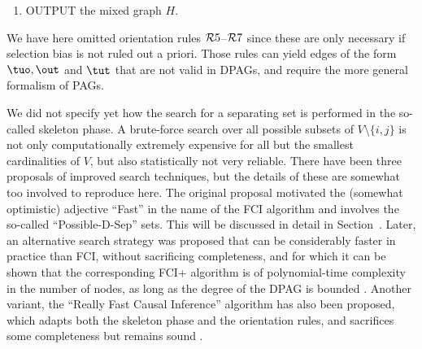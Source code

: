 \begin{enumerate}
    \begin{description}
      \item[$\C{R}8$] If $i \tuh j \tuh k$ in $H$, and $i \ouh k$ in $H$, then orient $i \tuh k$.
      \item[$\C{R}9$] If $i \ouh k$, and $\pi = \lt i, j, \dots, k \rt$ is an uncovered possibly directed path in $H$ from $i$ to $k$ such that $j$ and $k$ are not adjacent in $H$, then orient $i \tuh k$.
      \item[$\C{R}10$] Suppose that $i \ouh k$ in $H$, $j \tuh k \hut l$ in $H$, $\pi_1$ is a uncovered possibly directed path in $H$ from $i$ to $j$, and $\pi_2$ is a uncovered possibly directed path in $H$ from $i$ to $l$. Let $u_1$ be the vertex adjacent to $i$ on $\pi_1$ (possibly $u_1 = j$) and $u_2$ the vertex adjacent to $i$ on $\pi_2$ (possible $u_2 = l$). If $u_1 \ne u_2$, and $u_1$ and $u_2$ are not adjacent in $H$, then orient $i \tuh k$.
    \end{description}
  \item OUTPUT the mixed graph $H$.
\end{enumerate}
We have here omitted orientation rules $\mathcal{R}5$--$\mathcal{R}7$ since these are only necessary if selection bias is not ruled out a
priori. 
Those rules can yield edges of the form $\tuo, \out$ and $\tut$ that are not valid in DPAGs, and require the more general
formalism of PAGs.

We did not specify yet how the search for a separating set is performed in the so-called skeleton phase.
A brute-force search over all possible subsets of $V\setminus \{i,j\}$ is not only computationally extremely expensive for all but the smallest cardinalities of $V$, but also statistically not very reliable.
There have been three proposals of improved search techniques, but the details of these are somewhat too involved to reproduce here.
The original proposal motivated the (somewhat optimistic) adjective ``Fast'' in the name of the FCI algorithm and involves the so-called ``Possible-D-Sep'' sets. This will be discussed in detail in Section~\label{ref:fci_skeleton}.
Later, an alternative search strategy was proposed that can be considerably faster in practice than FCI, without sacrificing completeness, and for which it can be shown that the corresponding FCI+ algorithm is of polynomial-time complexity in the number of nodes, as long as the degree of the DPAG is bounded \cite{ClaassenMooijHeskes_UAI_13}.
Another variant, the ``Really Fast Causal Inference'' algorithm has also been proposed, which adapts both the skeleton phase and the orientation rules, and sacrifices some completeness but remains sound \cite{Colombo++2012}.

